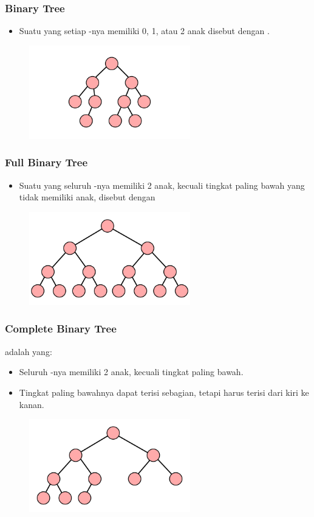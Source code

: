 \begin{frame}
\frametitle{Binary Tree}
\begin{itemize}
  \item Suatu  yang setiap \fnode-nya memiliki 0, 1, atau 2 anak disebut dengan .
\end{itemize}
\begin{figure}
  \includegraphics[width=7cm]{asset/binary-tree.pdf}
\end{figure}
\end{frame}

\begin{frame}
\frametitle{Full Binary Tree}
\begin{itemize}
  \item Suatu  yang seluruh \fnode-nya memiliki 2 anak, kecuali tingkat paling bawah yang tidak memiliki anak, disebut dengan 
\end{itemize}
\begin{figure}
  \includegraphics[width=7cm]{asset/full-binary-tree.pdf}
\end{figure}
\end{frame}

\begin{frame}
\frametitle{Complete Binary Tree}
 adalah  yang:
\begin{itemize}
  \item Seluruh \fnode-nya memiliki 2 anak, kecuali tingkat paling bawah.
  \item Tingkat paling bawahnya dapat terisi sebagian, tetapi harus terisi dari kiri ke kanan.
\end{itemize}
\begin{figure}
  \includegraphics[width=7cm]{asset/complete-binary-tree.pdf}
\end{figure}
\end{frame}

